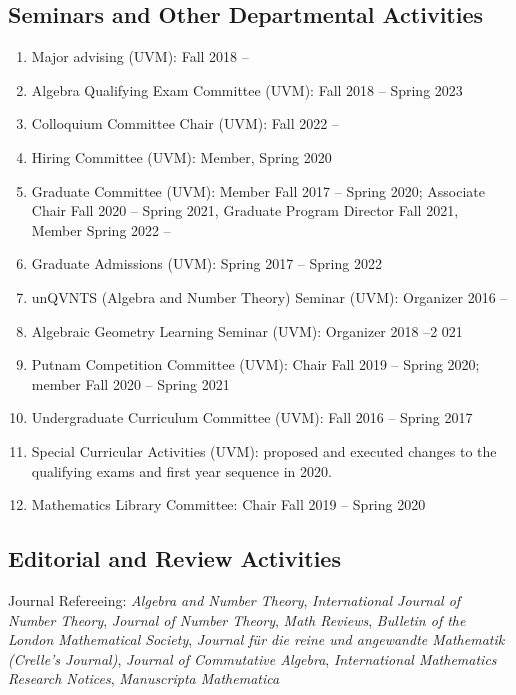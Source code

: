 \documentclass[a4paper,10pt]{article}
\begin{document}
\subsection*{Seminars and Other Departmental Activities}

\begin{enumerate}
	\item Major advising (UVM): Fall 2018 --
	\item Algebra Qualifying Exam Committee (UVM): Fall 2018 -- Spring 2023
	\item Colloquium Committee Chair (UVM): Fall 2022 --
	\item Hiring Committee (UVM): Member, Spring 2020
	\item Graduate Committee (UVM): Member Fall 2017 -- Spring 2020; Associate Chair Fall 2020 -- Spring 2021, Graduate Program Director Fall 2021, Member Spring 2022 -- 
	\item Graduate Admissions (UVM): Spring 2017 -- Spring 2022
	\item unQVNTS (Algebra and Number Theory) Seminar (UVM): Organizer 2016 --
	\item Algebraic Geometry Learning Seminar (UVM): Organizer 2018 --2 021
	\item Putnam Competition Committee (UVM): Chair Fall 2019 -- Spring 2020; member Fall 2020 -- Spring 2021
	\item Undergraduate Curriculum Committee (UVM): Fall 2016 -- Spring 2017 
	\item Special Curricular Activities (UVM): proposed and executed changes to the qualifying exams and first year sequence in 2020. 
	\item Mathematics Library Committee:  Chair Fall 2019 -- Spring 2020
\end{enumerate}

\subsection*{Editorial and Review Activities}
Journal Refereeing: \emph{Algebra and Number Theory}, \emph{International Journal of Number Theory}, \emph{Journal of Number Theory}, \emph{Math Reviews}, \emph{Bulletin of the London Mathematical Society},  \emph{Journal für die reine und angewandte Mathematik (Crelle’s Journal)}, \emph{Journal of Commutative Algebra}, \emph{International Mathematics Research Notices}, \emph{Manuscripta Mathematica}
\end{document}
